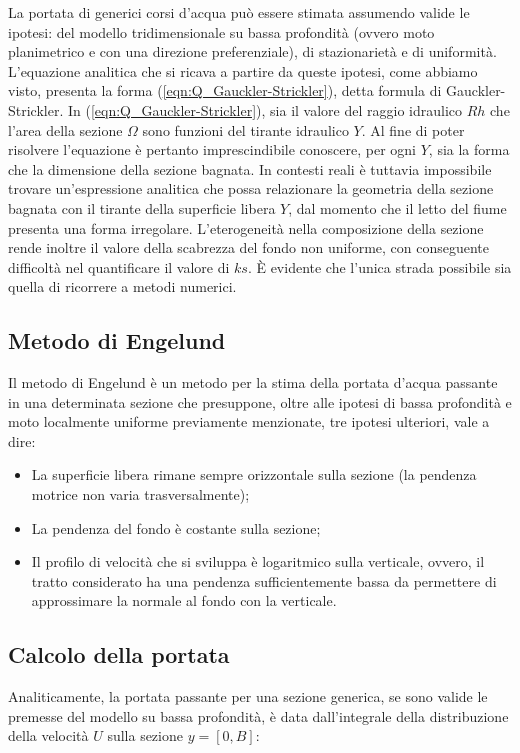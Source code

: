 \documentclass[12pt]{article} %
\begin{document}
\noindent La portata di generici corsi d’acqua può essere stimata assumendo valide le ipotesi: del modello tridimensionale su bassa profondità (ovvero moto planimetrico e con una direzione preferenziale), di stazionarietà e di uniformità. L’equazione analitica che si ricava a partire da queste ipotesi, come abbiamo visto, presenta la forma (\ref{eqn:Q_Gauckler-Strickler}), detta formula di Gauckler-Strickler.
In (\ref{eqn:Q_Gauckler-Strickler}), sia il valore del raggio idraulico $Rh$ che l’area della sezione $\Omega$ sono funzioni del tirante idraulico $Y$. Al fine di poter risolvere l’equazione è pertanto imprescindibile conoscere, per ogni $Y$, sia la forma che la dimensione della sezione bagnata. In contesti reali è tuttavia impossibile trovare un'espressione analitica che possa relazionare la geometria della sezione bagnata con il tirante della superficie libera $Y$, dal momento che il letto del fiume presenta una forma irregolare. L’eterogeneità nella composizione della sezione rende inoltre il valore della scabrezza del fondo non uniforme, con conseguente difficoltà nel quantificare il valore di $ks$. È evidente che l’unica strada possibile sia quella di ricorrere a metodi numerici.

\subsection{Metodo di Engelund}
\noindent Il metodo di Engelund è un metodo per la stima della portata d’acqua passante in una determinata sezione che presuppone, oltre alle ipotesi di bassa profondità e moto localmente uniforme previamente menzionate, tre ipotesi ulteriori, vale a dire:
\begin{itemize}
    \item La superficie libera rimane sempre orizzontale sulla sezione (la pendenza motrice non varia trasversalmente);
    \item La pendenza del fondo è costante sulla sezione;
    \item Il profilo di velocità che si sviluppa è logaritmico sulla verticale, ovvero, il tratto considerato ha una pendenza sufficientemente bassa da permettere di approssimare la normale al fondo con la verticale.
\end{itemize}

\subsection{Calcolo della portata}
\noindent Analiticamente, la portata passante per una sezione generica, se sono valide le premesse del modello su bassa profondità, è data dall’integrale della distribuzione della velocità $U$ sulla sezione $y = [0, B]$:
\end{document}
